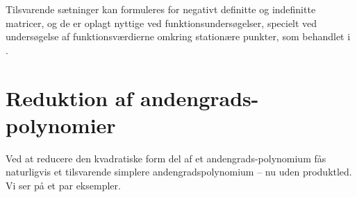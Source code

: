 Tilsvarende sætninger kan formuleres for negativt definitte og indefinitte matricer, og de er oplagt nyttige ved funktionsundersøgelser, specielt ved undersøgelse af funktionsværdierne omkring stationære punkter, som behandlet i
.




\section{Reduktion af andengrads-polynomier}

Ved at reducere den kvadratiske form del af et andengrads-polynomium fås naturligvis
et tilsvarende simplere andengradspolynomium -- nu uden produktled. Vi ser på et par eksempler.

